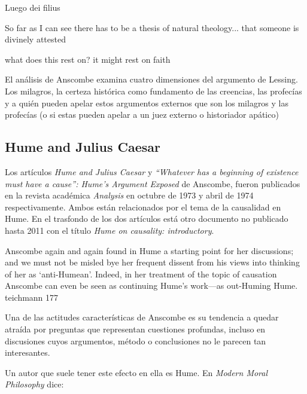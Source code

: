 Luego dei filius

So far as I can see there has to be a thesis of natural theology... that someone
is divinely attested

what does this rest on? it might rest on faith



El análisis de Anscombe examina cuatro dimensiones del argumento de Lessing. Los
milagros, la certeza histórica como fundamento de las creencias, las profecías y
a quién pueden apelar estos argumentos externos que son los milagros y las
profecías (o si estas pueden apelar a un juez externo o historiador apático)

\subsection{Hume and Julius Caesar}

Los artículos \emph{Hume and Julius Caesar} y \emph{``Whatever has a beginning
  of existence must have a cause'': Hume’s Argument Exposed} de Anscombe, fueron
publicados en la revista académica \emph{Analysis} en octubre de 1973 y abril de
1974 respectivamente. Ambos están relacionados por el tema de la causalidad en
Hume. En el trasfondo de los dos artículos está otro documento no publicado
hasta 2011 con el título \emph{Hume on causality: introductory}.

Anscombe again and again found in Hume a starting point for her discussions; and
we must not be misled bye her frequent dissent from his views into thinking of
her as `anti-Humean'. Indeed, in her treatment of the topic of causation
Anscombe can even be seen as continuing Hume's work---as out-Huming Hume.
teichmann 177

  Una de las actitudes características de Anscombe es su tendencia a quedar
  atraída por preguntas que representan cuestiones profundas, incluso en
  discusiones cuyos argumentos, método o conclusiones no le parecen tan
  interesantes.

  Un autor que suele tener este efecto en ella es Hume. En \emph{Modern Moral
    Philosophy} dice:

